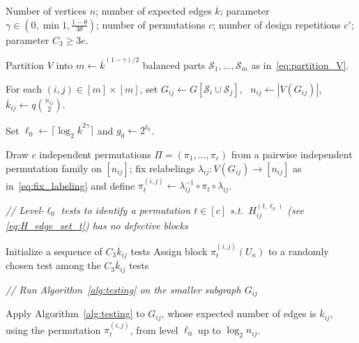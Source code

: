 \documentclass[journal]{IEEEtran}
\theoremstyle{definition}
\theoremstyle{definition}
\newcommand{\Sc}{\mathcal{S}}
\newcommand{\kb}{\overline{k}}
\begin{document}
\begin{algorithm*}[t]
\caption{Test Design Based on Permutations and Smaller Subproblems}
\label{alg:testing_permutation}
\begin{algorithmic}[1]
\REQUIRE
\parbox[t]{0.88\linewidth}{
Number of vertices $n$; number of expected edges $\kb$; parameter
$\gamma \in (0, \min {1, \frac{1-\theta}{3\theta} } )$; number of
permutations $c$; number of design repetitions $c'$; parameter
$C_3 \ge 3e$.
}

\STATE Partition $V$ into $m \gets \kb^{(1-\gamma)/2}$ balanced parts
$\Sc_1,\dots,\Sc_m$ as in~\eqref{eq:partition_V}.

\STATE For each $(i,j)\in[m]\times[m]$, set
$G_{ij} \gets G[\Sc_i \cup \Sc_j]$, \ $n_{ij} \gets |V(G_{ij})|$,
\ $\kb_{ij} \gets q \binom{n_{ij}}{2}$.

\STATE Set $\ell_{0} \gets \lceil \log_2 \kb^{2\gamma} \rceil$ and
$g_0 \gets 2^{\ell_0}$.

\STATE
\parbox[t]{0.93\linewidth}{
Draw \(c\) independent permutations \(\Pi=(\pi_1,\dots,\pi_c)\)
from a pairwise independent permutation family on \([n_{ij}]\);
fix relabelings $\lambda_{ij}: V(G_{ij}) \to  [n_{ij}]$ as
in~\eqref{eq:fix_labeling} and define
$\pi_t^{(i,j)} \gets \lambda_{ij}^{-1} \circ \pi_t \circ \lambda_{ij}$.
}

      \STATE
      \parbox[t]{0.91\linewidth}{
      \textit{\color{blue}// Level-$\ell_0$ tests to identify a permutation
      $t \in [c]$ s.t.~$H_{ij}^{(t,\ell_0)}$
      (see \eqref{eq:H_edge_set_t}) has no defective blocks}
      }

        \STATE Initialize a sequence of $C_3 \kb_{ij}$ tests
          \STATE Assign block \( \pi_{t}^{(i,j)}(U_{\kappa}) \) to a randomly chosen test among the $C_3 \kb_{ij}$ tests
        \ENDFOR
      \ENDFOR

      \STATE \textit{\color{blue}// Run Algorithm~\ref{alg:testing} on the smaller subgraph $G_{ij}$}

      \STATE
      \parbox[t]{0.91\linewidth}{
      Apply Algorithm~\ref{alg:testing} to $G_{ij}$, whose expected
      number of edges is $\kb_{ij}$, using the permutation
      $\pi_t^{(i,j)}$, from level $\ell_{0}$ up to $\log_2 n_{ij}$.
      }
    \ENDFOR
  \ENDFOR
\ENDFOR

\end{algorithmic}
\end{algorithm*}
\end{document}
